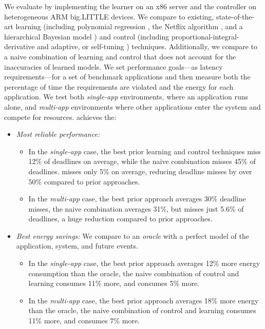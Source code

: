 We evaluate \SYSTEM{} by implementing the learner on an x86 server and
the controller on heterogeneous ARM big.LITTLE devices.  We compare
\SYSTEM{} to existing, state-of-the-art learning (including polynomial
regression \cite{}, the Netflix algorithm \cite{}, and a hierarchical
Bayesian model \cite{}) and control (including
proportional-integral-derivative \cite{} and adaptive, or self-tuning
\cite{}) techniques.  Additionally, we compare to a naive combination
of learning and control that does not account for the inaccuracies of
learned models.  We set performance goals---as latency
requirements---for a set of benchmark applications and then measure
both the percentage of time the requirements are violated and the
energy for each application.  We test both \emph{single-app}
environments, where an application runs alone, and \emph{multi-app}
environments where other applications enter the system and compete for
resources.  \SYSTEM{} achieves the:
\begin{itemize}[leftmargin=1em]
\item \textit{Most reliable performance:}
  \begin{itemize}[leftmargin=1em]
  \item In the \emph{single-app} case, the best prior learning and
    control techniques miss 12\% of deadlines on average, while the
    naive combination misses 45\% of deadlines. \SYSTEM{} misses only
    5\% on average, reducing deadline misses by over 50\% compared to
    prior approaches.
  \item In the \emph{multi-app} case, the best prior approach averages
    30\% deadline misses, the naive combination averages 31\%, but
    \SYSTEM{} misses just 5.6\% of deadlines, a huge reduction
    compared to prior approaches.
  \end{itemize}
\item \textit{Best energy savings:} We compare to an \emph{oracle}
  with a perfect model of the application, system, and future events.
  \begin{itemize}[leftmargin=1em]
  \item In the \emph{single-app} case, the best prior approach
    averages 12\% more energy consumption than the oracle, the naive
    combination of control and learning consumes 11\% more, and
    \SYSTEM{} consumes 5\% more.
  \item In the \emph{multi-app} case, the best prior approach averages
    18\% more energy than the oracle, the naive combination of control
    and learning consumes 11\% more, and \SYSTEM{} consumes 7\% more.
  \end{itemize}
\end{itemize}

